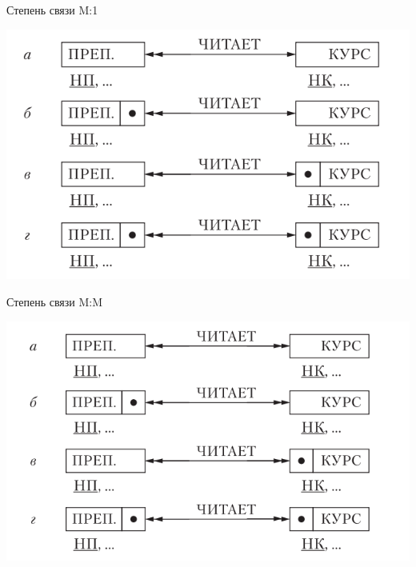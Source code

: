 \documentclass{beamer}
\begin{document}
\begin{frame}{Степень связи M:1}
\begin{center}
\includegraphics[scale=0.6]{images/lec03-pic07.png}
\end{center}
\end{frame}

\begin{frame}{Степень связи M:M}
\begin{center}
\includegraphics[scale=0.6]{images/lec03-pic08.png}
\end{center}
\end{frame}
\end{document}
